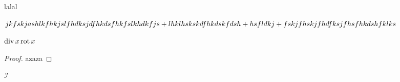 \documentclass{article}
\begin{document}
    
    \fsrheader
    
    \begin{thm}
        lalal
    \end{thm}
    
    
    $jkfskjashlkfhkjslfhdksjdfhkdsfhkfslkhdkfjs+lhklhskskdfhkdskfdsh\hm+ hsfldkj\hm+fskjfhskjfhdfksjfhsfhkdshfklks$
    
    $\mathop{\operatorname{div}} x \operatorname{rot} x$
    
    \begin{proof}
    azaza
    \end{proof}
    
    \begin{namedExample}[123]
    
    \end{namedExample}
    
    $\mathcal{I}$
    
\end{document}
